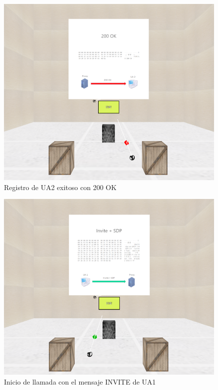 \documentclass[a4paper, 12pt]{book}
\begin{document}
\begin{figure}
  \centering
  \includegraphics[width=12cm, keepaspectratio]{img/resultados/04-200OK.png}
  \caption{Registro de UA2 exitoso con 200 OK}
  \label{fig:04-200OK}
\end{figure}

\begin{figure}
  \centering
  \includegraphics[width=12cm, keepaspectratio]{img/resultados/05-Invite.png}
  \caption{Inicio de llamada con el mensaje INVITE de UA1}
  \label{fig:05-Invite}
\end{figure}
\end{document}
